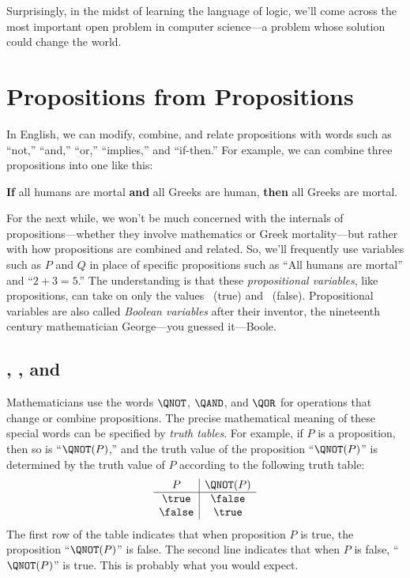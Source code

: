 Surprisingly, in the midst of learning the language of logic, we'll come
across the most important open problem in computer science---a problem
whose solution could change the world.


\section{Propositions from Propositions}\label{propform_sec}

In English, we can modify, combine, and relate propositions with words
such as ``not,'' ``and,'' ``or,'' ``implies,'' and ``if-then.''
For example, we can combine three propositions into one like this:
%
\begin{center}
\textbf{If} all humans are mortal \textbf{and} all Greeks are human,
\textbf{then} all Greeks are mortal.
\end{center}

For the next while, we won't be much concerned with the internals of
propositions---whether they involve mathematics or Greek mortality---but
rather with how propositions are combined and related.  So, we'll
frequently use variables such as $P$ and $Q$ in place of specific
propositions such as ``All humans are mortal'' and ``$2 + 3 = 5$.''  The
understanding is that these \emph{propositional variables},%
 like propositions, can 
take on only the values \true~(true) and \false~(false).
Propositional variables are also called \emph{Boolean variables}%
after their inventor, the nineteenth century mathematician%
George---you guessed it---Boole.

\subsection{\QNOT, \QAND, and \QOR}
Mathematicians use the words $\QNOT$, $\QAND$, and $\QOR$
for operations that change or combine propositions.  The precise
mathematical meaning of these special words can be specified by
\emph{truth%
tables}.  For example, if $P$ is a proposition,
then so is ``$\QNOT(P)$,'' and the truth value of the proposition
``$\QNOT(P)$'' is determined by the truth value of $P$ according to the
following truth table:
%
\[
\begin{array}{c|c}
P & \QNOT(P) \\ \hline
\true & \false \\
\false & \true \\
\end{array}
\]
%
The first row of the table indicates that when proposition $P$ is true,
the proposition ``$\QNOT(P)$'' is false.  The second line indicates that
when $P$ is false, ``$\QNOT(P)$'' is true.  This is probably what you
would expect.

